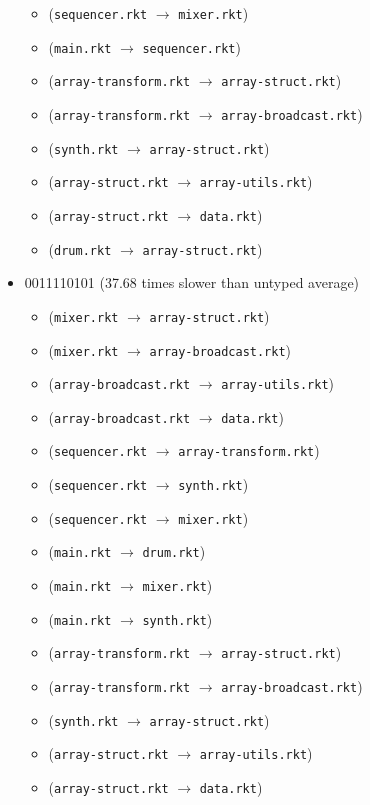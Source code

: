 \documentclass{article}
\newcommand{\mono}[1]{\texttt{#1}}
\begin{document}
\begin{itemize}
\begin{itemize}
  \item (\mono{sequencer.rkt} $\rightarrow$ \mono{mixer.rkt})
  \item (\mono{main.rkt} $\rightarrow$ \mono{sequencer.rkt})
  \item (\mono{array-transform.rkt} $\rightarrow$ \mono{array-struct.rkt})
  \item (\mono{array-transform.rkt} $\rightarrow$ \mono{array-broadcast.rkt})
  \item (\mono{synth.rkt} $\rightarrow$ \mono{array-struct.rkt})
  \item (\mono{array-struct.rkt} $\rightarrow$ \mono{array-utils.rkt})
  \item (\mono{array-struct.rkt} $\rightarrow$ \mono{data.rkt})
  \item (\mono{drum.rkt} $\rightarrow$ \mono{array-struct.rkt})
  \end{itemize}
\item 0011110101 (37.68 times slower than untyped average)
  \begin{itemize}
  \item (\mono{mixer.rkt} $\rightarrow$ \mono{array-struct.rkt})
  \item (\mono{mixer.rkt} $\rightarrow$ \mono{array-broadcast.rkt})
  \item (\mono{array-broadcast.rkt} $\rightarrow$ \mono{array-utils.rkt})
  \item (\mono{array-broadcast.rkt} $\rightarrow$ \mono{data.rkt})
  \item (\mono{sequencer.rkt} $\rightarrow$ \mono{array-transform.rkt})
  \item (\mono{sequencer.rkt} $\rightarrow$ \mono{synth.rkt})
  \item (\mono{sequencer.rkt} $\rightarrow$ \mono{mixer.rkt})
  \item (\mono{main.rkt} $\rightarrow$ \mono{drum.rkt})
  \item (\mono{main.rkt} $\rightarrow$ \mono{mixer.rkt})
  \item (\mono{main.rkt} $\rightarrow$ \mono{synth.rkt})
  \item (\mono{array-transform.rkt} $\rightarrow$ \mono{array-struct.rkt})
  \item (\mono{array-transform.rkt} $\rightarrow$ \mono{array-broadcast.rkt})
  \item (\mono{synth.rkt} $\rightarrow$ \mono{array-struct.rkt})
  \item (\mono{array-struct.rkt} $\rightarrow$ \mono{array-utils.rkt})
  \item (\mono{array-struct.rkt} $\rightarrow$ \mono{data.rkt})

\end{itemize}
\end{itemize}
\end{document}
